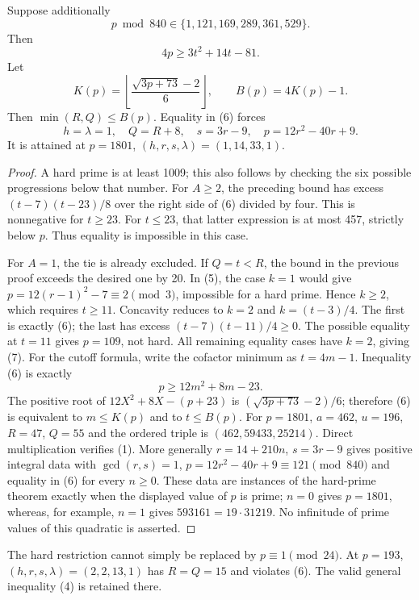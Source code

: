 \begin{theorem}\label{thm:hard}
Suppose additionally
\[
 p\bmod840\in\{1,121,169,289,361,529\}.
\]
Then
\[
 \boxed{4p\ge3t^2+14t-81.}                               \tag{6}
\]
Let
\[
 K(p)=\left\lfloor\frac{\sqrt{3p+73}-2}{6}\right\rfloor,
 \qquad B(p)=4K(p)-1.
\]
Then $\min(R,Q)\le B(p)$. Equality in (6) forces
\[
 h=\lambda=1,\quad Q=R+8,\quad s=3r-9,\quad
 p=12r^2-40r+9.                                         \tag{7}
\]
It is attained at $p=1801$, $(h,r,s,\lambda)=(1,14,33,1)$.
\end{theorem}
\begin{proof}
A hard prime is at least 1009; this also follows by checking the six possible
progressions below that number. For $A\ge2$, the preceding bound has excess
$(t-7)(t-23)/8$ over the right side of (6) divided by four. This is nonnegative
for $t\ge23$. For $t\le23$, that latter expression is at most 457, strictly
below $p$. Thus equality is impossible in this case.

For $A=1$, the tie is already excluded. If $Q=t<R$, the bound in the previous
proof exceeds the desired one by 20. In (5), the case $k=1$ would give
$p=12(r-1)^2-7\equiv2\pmod3$, impossible for a hard prime. Hence $k\ge2$,
which requires $t\ge11$. Concavity reduces to $k=2$ and $k=(t-3)/4$.
The first is exactly (6); the last has excess $(t-7)(t-11)/4\ge0$.
The possible equality at $t=11$ gives $p=109$, not hard. All remaining equality
cases have $k=2$, giving (7). For the cutoff formula, write the cofactor minimum
as $t=4m-1$. Inequality (6) is exactly
\[
 p\ge12m^2+8m-23.
\]
The positive root of $12X^2+8X-(p+23)$ is
$(\sqrt{3p+73}-2)/6$; therefore (6) is equivalent to
$m\le K(p)$ and to $t\le B(p)$.
For $p=1801$, $a=462$, $u=196$, $R=47$, $Q=55$ and the ordered triple is
$(462,59433,25214)$. Direct multiplication verifies (1).
More generally $r=14+210n$, $s=3r-9$ gives positive integral data with
$\gcd(r,s)=1$, $p=12r^2-40r+9\equiv121\pmod{840}$ and equality in (6)
for every $n\ge0$. These data are instances of the hard-prime theorem exactly
when the displayed value of $p$ is prime; $n=0$ gives $p=1801$, whereas, for
example, $n=1$ gives $593161=19\cdot31219$. No infinitude of prime values of
this quadratic is asserted.
\end{proof}

The hard restriction cannot simply be replaced by $p\equiv1\pmod{24}$.
At $p=193$, $(h,r,s,\lambda)=(2,2,13,1)$ has $R=Q=15$ and violates (6).
The valid general inequality (4) is retained there.

